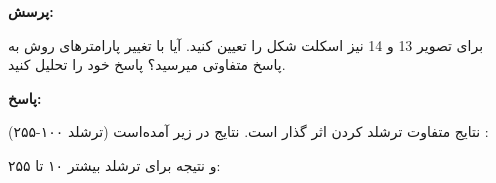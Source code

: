 \documentclass[12pt,a4paper]{article}
\theoremstyle{definition}
\theoremstyle{theorem}
\theoremstyle{definition}
\begin{document}
\textbf{پرسش:}

 برای تصویر 13 و 14 نیز اسکلت شکل را تعیین کنید. آیا با تغییر پارامترهای روش به پاسخ متفاوتی میرسید؟ پاسخ خود را تحلیل کنید.
 
 
\textbf{پاسخ:}

نتایج متفاوت ترشلد کردن اثر گذار است. نتایج در زیر آمده‌است (ترشلد ۱۰۰-۲۵۵) :‌


\begin{center}
\end{center}

و نتیجه برای ترشلد بیشتر ۱۰ تا ۲۵۵:
\end{document}
